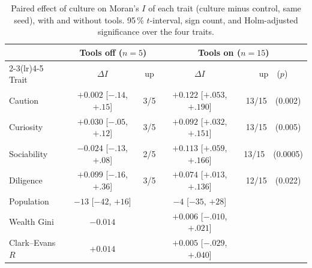\documentclass[11pt]{article}
\theoremstyle{definition}
\newcommand{\1}{\mathbf{1}}
\begin{document}
\begin{table}[h]
\centering\small
\caption{Paired effect of culture on Moran's $I$ of each trait (culture minus control, same seed), with and without tools. 95\,\% $t$-interval, sign count, and Holm-adjusted significance over the four traits.}
\label{tab:culture}
\begin{tabular}{lcccc}
\toprule
& \multicolumn{2}{c}{Tools off ($n=5$)} & \multicolumn{2}{c}{Tools on ($n=15$)}\\
\cmidrule(lr){2-3}\cmidrule(lr){4-5}
Trait & $\Delta I$ & up & $\Delta I$ & up\ \ ($p$)\\
\midrule
Caution & $+0.002$ {\scriptsize[$-.14$, $+.15$]} & 3/5 & $\mathbf{+0.122}$ {\scriptsize[$+.053$, $+.190$]} & 13/15\ \ (0.002)\\
Curiosity & $+0.030$ {\scriptsize[$-.05$, $+.12$]} & 3/5 & $\mathbf{+0.092}$ {\scriptsize[$+.032$, $+.151$]} & 13/15\ \ (0.005)\\
Sociability & $-0.024$ {\scriptsize[$-.13$, $+.08$]} & 2/5 & $\mathbf{+0.113}$ {\scriptsize[$+.059$, $+.166$]} & 13/15\ \ (0.0005)\\
Diligence & $+0.099$ {\scriptsize[$-.16$, $+.36$]} & 3/5 & $\mathbf{+0.074}$ {\scriptsize[$+.013$, $+.136$]} & 12/15\ \ (0.022)\\
\midrule
Population & $-13$ {\scriptsize[$-42$, $+16$]} & & $-4$ {\scriptsize[$-35$, $+28$]} & \\
Wealth Gini & $-0.014$ & & $+0.006$ {\scriptsize[$-.010$, $+.021$]} & \\
Clark--Evans $R$ & $+0.014$ & & $+0.005$ {\scriptsize[$-.029$, $+.040$]} & \\
\bottomrule
\end{tabular}
\end{table}
\end{document}
